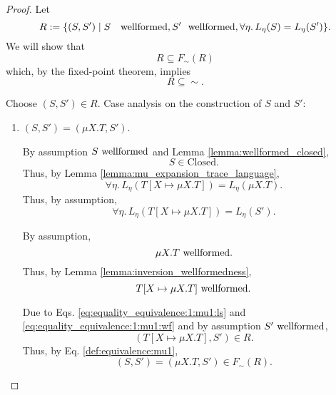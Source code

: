 \documentclass{llncs}
\newcommand*{\Closed}{\mathrm{Closed}}
\newcommand*{\sequiv}{\sim}
\newcommand*{\wf}[1]{\text{$#1$ {\normalfont \rmfamily wellformed}}}
\renewcommand*{\|}{\;|\;}
\begin{document}
\begin{proof}
  Let
  \begin{equation*}
    R := \{(S, S') \| \wf{S}, \wf{S'}, \forall \eta.\, L_\eta(S) = L_\eta(S') \}.
  \end{equation*}
  We will show that
  \begin{equation*}
    R \subseteq F_\sequiv(R)
  \end{equation*}
  which, by the fixed-point theorem, implies
  \begin{equation*}
    R \subseteq \sequiv.
  \end{equation*}

  Choose $(S, S') \in R$.
  Case analysis on the construction of $S$ and $S'$:
  \begin{enumerate}
    \item
      \label{case:equality_equivalence:mu1}
      $(S, S') = (\mu X.T, S')$.

      By assumption $\wf{S}$ and Lemma \ref{lemma:wellformed_closed},
      \begin{equation*}
        S \in \Closed.
      \end{equation*}
      Thus, by Lemma \ref{lemma:mu_expansion_trace_language},
      \begin{equation*}
        \forall \eta.\, L_\eta(T[X \mapsto \mu X.T]) = L_\eta(\mu X.T).
      \end{equation*}
      Thus, by assumption,
      \begin{equation}
        \label{eq:equality_equivalence:1:mu1:ls}
        \forall \eta.\, L_\eta(T[X \mapsto \mu X.T]) = L_\eta(S').
      \end{equation}

      By assumption,
      \begin{equation*}
        \wf{\mu X.T}.
      \end{equation*}
      Thus, by Lemma \ref{lemma:inversion_wellformedness},
      \begin{equation}
        \label{eq:equality_equivalence:1:mu1:wf}
        \wf{T[X \mapsto \mu X.T]}.
      \end{equation}

      Due to Eqs. \ref{eq:equality_equivalence:1:mu1:ls} and
      \ref{eq:equality_equivalence:1:mu1:wf} and by assumption
      $\wf{S'}$,
      \begin{equation*}
        (T[X \mapsto \mu X.T], S') \in R.
      \end{equation*}
      Thus, by Eq. \ref{def:equivalence:mu1},
      \begin{equation*}
        (S, S') = (\mu X.T, S') \in F_\sequiv(R).
      \end{equation*}


\end{enumerate}
\end{proof}
\end{document}
